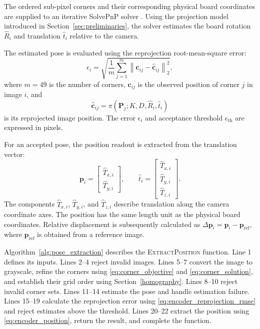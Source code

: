 \documentclass[journal]{IEEEtran}
\begin{document}
The ordered sub-pixel corners and their corresponding
physical board coordinates are supplied to an iterative
SolvePnP solver \cite{opencv_solvepnp}.
Using the projection model introduced in
Section~\ref{sec:preliminaries}, the solver estimates
the board rotation $\hat R_i$ and translation
$\hat t_i$ relative to the camera.

The estimated pose is evaluated using the
reprojection root-mean-square error:
\begin{equation}
\label{eq:encoder_reprojection_rmse}
\epsilon_i
=
\sqrt{
\frac{1}{m}
\sum_{j=1}^{m}
\left\|
\mathbf c_{ij}-\hat{\mathbf c}_{ij}
\right\|_2^2
},
\end{equation}
where $m=49$ is the number of corners,
$\mathbf c_{ij}$ is the observed position of
corner $j$ in image $i$, and
\[
\hat{\mathbf c}_{ij}
=
\pi(\mathbf P_j;K,D,\hat R_i,\hat t_i)
\]
is its reprojected image position.
The error $\epsilon_i$ and acceptance threshold
$\epsilon_{\mathrm{th}}$ are expressed in pixels.

For an accepted pose, the position readout is
extracted from the translation vector:
\begin{equation}
\label{eq:encoder_position}
\mathbf p_i
=
\begin{bmatrix}
\hat T_{x,i}\\
\hat T_{y,i}
\end{bmatrix},
\qquad
\hat t_i
=
\begin{bmatrix}
\hat T_{x,i}\\
\hat T_{y,i}\\
\hat T_{z,i}
\end{bmatrix}.
\end{equation}
The components $\hat T_{x,i}$, $\hat T_{y,i}$,
and $\hat T_{z,i}$ describe translation along
the camera coordinate axes.
The position has the same length unit as
the physical board coordinates.
Relative displacement is subsequently calculated as
$\Delta\mathbf p_i=\mathbf p_i-\mathbf p_{\mathrm{ref}}$,
where $\mathbf p_{\mathrm{ref}}$ is obtained
from a reference image.

Algorithm~\ref{alg:pose_extraction} describes
the \textsc{ExtractPosition} function.
Line 1 defines its inputs.
Lines 2--4 reject invalid images.
Lines 5--7 convert the image to grayscale,
refine the corners using
\eqref{eq:corner_objective} and
\eqref{eq:corner_solution}, and establish
their grid order using Section~\ref{homography}.
Lines 8--10 reject invalid corner sets.
Lines 11--14 estimate the pose and handle
estimation failure.
Lines 15--19 calculate the reprojection error
using \eqref{eq:encoder_reprojection_rmse}
and reject estimates above the threshold.
Lines 20--22 extract the position using
\eqref{eq:encoder_position}, return the result,
and complete the function.
\end{document}
